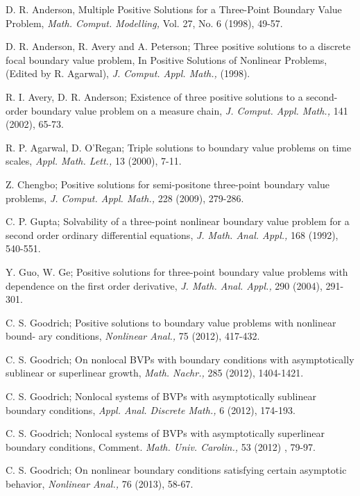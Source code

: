 \documentclass[reqno]{amsart}\usepackage{amsmath}
\begin{document}
\begin{thebibliography}{9}

 D. R. Anderson, Multiple Positive Solutions
for a Three-Point Boundary Value Problem, \emph{Math. Comput. Modelling,} Vol. 27, No. 6 (1998), 49-57.

 D. R. Anderson, R. Avery and A. Peterson;  Three positive solutions to a discrete focal boundary value problem, In Positive Solutions of Nonlinear Problems, (Edited by R. Agarwal),  \emph{J. Comput. Appl. Math.,} (1998).


  R. I. Avery, D. R. Anderson; Existence of three positive solutions to a second-order
boundary value problem on a measure chain, \emph{J. Comput. Appl. Math.,} 141 (2002), 65-73.


  R. P. Agarwal, D. O'Regan; Triple solutions to boundary value
problems on time scales,  \emph{Appl. Math. Lett.,} 13 (2000), 7-11.



 Z. Chengbo; Positive solutions for semi-positone three-point boundary value problems, \emph{J. Comput. Appl. Math.,} 228 (2009), 279-286.

 C. P. Gupta; Solvability of a three-point nonlinear boundary value
problem for a second order ordinary differential equations, \emph{J. Math.
Anal. Appl.,} 168 (1992), 540-551.

 Y. Guo, W. Ge; Positive solutions for three-point boundary value problems with dependence
on the first order derivative, \emph{J. Math. Anal. Appl.,} 290 (2004), 291-301.


 C. S. Goodrich; Positive solutions to boundary value problems with nonlinear bound-
ary conditions, \emph{Nonlinear Anal.,} 75 (2012), 417-432.

 C. S. Goodrich; On nonlocal BVPs with boundary conditions with asymptotically
sublinear or superlinear growth, \emph{Math. Nachr.,} 285 (2012), 1404-1421.

 C. S. Goodrich; Nonlocal systems of BVPs with asymptotically sublinear boundary
conditions, \emph{Appl. Anal. Discrete Math.,} 6 (2012), 174-193.

 C. S. Goodrich; Nonlocal systems of BVPs with asymptotically superlinear boundary
conditions, Comment. \emph{Math. Univ. Carolin.,} 53 (2012)
, 79-97.

 C. S. Goodrich; On nonlinear boundary conditions satisfying certain asymptotic
behavior, \emph{Nonlinear Anal.,} 76 (2013), 58-67.




\end{thebibliography}
\end{document}
